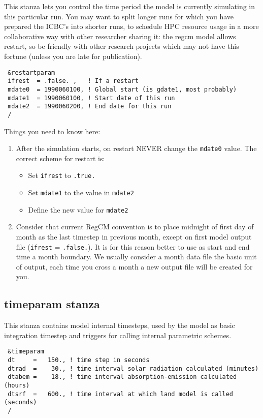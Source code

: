 This stanza lets you control the time period the model is currently simulating
in this particular run. You may want to split longer runs for which you have
prepared the ICBC's into shorter runs, to schedule HPC resource usage in a more
collaborative way with other researcher sharing it: the regcm model allows
restart, so be friendly with other research projects which may not have this
fortune (unless you are late for publication).

{\footnotesize
\begin{Verbatim}
 &restartparam
 ifrest  = .false. ,   ! If a restart
 mdate0  = 1990060100, ! Global start (is gdate1, most probably)
 mdate1  = 1990060100, ! Start date of this run
 mdate2  = 1990060200, ! End date for this run
 /
\end{Verbatim}
}

Things you need to know here:

\begin{enumerate}
\item After the simulation starts, on restart NEVER change the \verb=mdate0=
value. The correct scheme for restart is:
\begin{itemize}
\item Set \verb=ifrest= to \verb=.true.=
\item Set \verb=mdate1= to the value in \verb=mdate2=
\item Define the new value for \verb=mdate2=
\end{itemize}
\item Consider that current RegCM convention is to place midnight of first
day of month as the last timestep in previous month, except on first model
output file (\verb=ifrest= = \verb=.false.=). It is for this reason better
to use as start and end time a month boundary. We usually consider a month
data file the basic unit of output, each time you cross a month a new output
file will be created for you.
\end{enumerate}

\subsection{timeparam stanza}

This stanza contains model internal timesteps, used by the model as basic
integration timestep and triggers for calling internal parametric schemes.

{\footnotesize
\begin{Verbatim}
 &timeparam
 dt     =   150., ! time step in seconds
 dtrad  =    30., ! time interval solar radiation calculated (minutes)
 dtabem =    18., ! time interval absorption-emission calculated (hours)
 dtsrf  =   600., ! time interval at which land model is called (seconds)
 /
\end{Verbatim}
}

